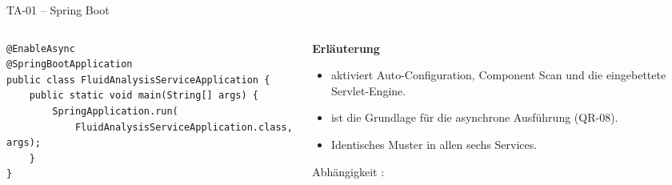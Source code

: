 
\begin{frame}[fragile]{TA-01 -- Spring Boot}
  \begin{columns}[T,onlytextwidth]
    \begin{column}{0.52\textwidth}
      \begin{lstlisting}[style=java]
@EnableAsync
@SpringBootApplication
public class FluidAnalysisServiceApplication {
    public static void main(String[] args) {
        SpringApplication.run(
            FluidAnalysisServiceApplication.class, args);
    }
}
      \end{lstlisting}
    \end{column}
    \begin{column}{0.44\textwidth}
      \textbf{Erläuterung}
      \begin{itemize}
        \item {} aktiviert Auto-Configuration, Component Scan und die eingebettete Servlet-Engine.
        \item {} ist die Grundlage für die asynchrone Ausführung (QR-08).
        \item Identisches Muster in allen sechs Services.
      \end{itemize}
      \vspace{0.2cm}
      \begin{block}{Abhängigkeit}
        \small {}: 
      \end{block}
    \end{column}
  \end{columns}
\end{frame}

